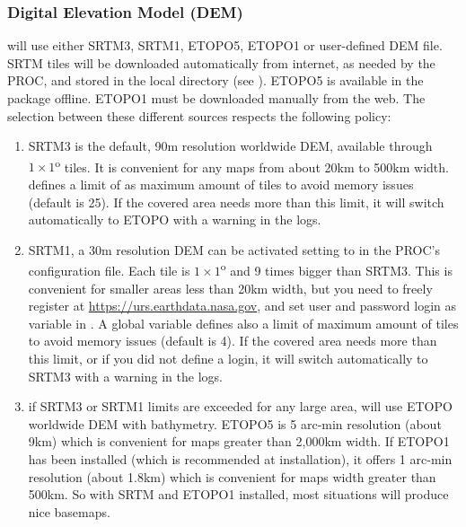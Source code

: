 \subsubsection{Digital Elevation Model (DEM)}
\label{dem}

\webobs will use either SRTM3, SRTM1, ETOPO5, ETOPO1 or user-defined DEM file. SRTM tiles will be downloaded automatically from internet, as needed by the PROC, and stored in the  local directory (see ). ETOPO5 is available in the \webobs package offline. ETOPO1 must be downloaded manually from the web. The selection between these different sources respects the following policy:
\begin{enumerate}

\item SRTM3 is the default, 90m resolution worldwide DEM, available through $1\times1$\textsuperscript{o} tiles. It is convenient for any maps from about 20km to 500km width.  defines a limit of  as maximum amount of tiles to avoid memory issues (default is 25). If the covered area needs more than this limit, it will switch automatically to ETOPO with a warning in the logs.

\item SRTM1, a 30m resolution DEM can be activated setting  to  in the PROC's configuration file. Each tile is $1\times1$\textsuperscript{o} and 9 times bigger than SRTM3. This is convenient for smaller areas less than 20km width, but you need to freely register at \url{https://urs.earthdata.nasa.gov}, and set user and password login as variable  in . A global variable defines also a limit of  maximum amount of tiles to avoid memory issues (default is 4). If the covered area needs more than this limit, or if you did not define a login, it will switch automatically to SRTM3 with a warning in the logs.

\item if SRTM3 or SRTM1 limits are exceeded for any large area, \webobs will use ETOPO worldwide DEM with bathymetry. ETOPO5 is 5 arc-min resolution (about 9km) which is convenient for maps greater than 2,000km width. If ETOPO1 has been installed (which is recommended at installation), it offers 1 arc-min resolution (about 1.8km) which is convenient for maps width greater than 500km. So with SRTM and ETOPO1 installed, most situations will produce nice basemaps.


\end{enumerate}
